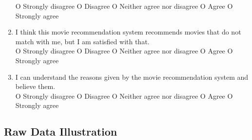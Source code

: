 \begin{enumerate}
O Strongly disagree O Disagree O Neither agree nor disagree O Agree O Strongly agree

\item I think this movie recommendation system recommends movies that do not match with me, but I am satisfied with that.\\

O Strongly disagree O Disagree O Neither agree nor disagree O Agree O Strongly agree

\item I can understand the reasons given by the movie recommendation system and believe them.\\

O Strongly disagree O Disagree O Neither agree nor disagree O Agree O Strongly agree

\end{enumerate}

\subsection{Raw Data Illustration}

\cleardoublepage